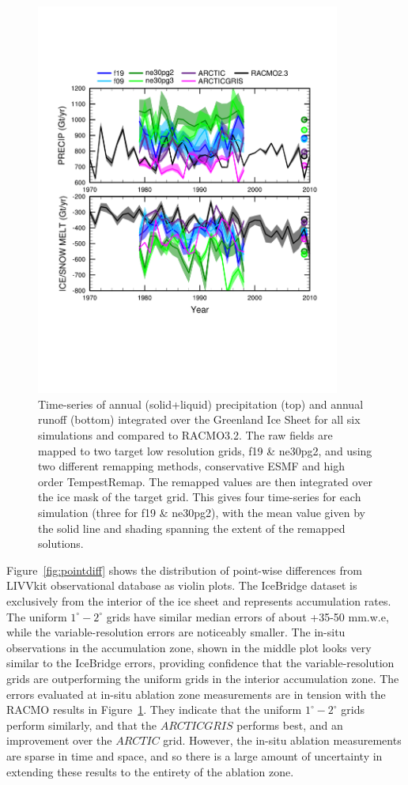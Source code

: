 \documentclass[draft]{agujournal2019}
\begin{document}
\begin{figure}[t]
\begin{center}
         \includegraphics[width=100mm]{figs/temp_tseries_GRIS.pdf}
\end{center}
\caption{Time-series of annual (solid+liquid) precipitation (top) and annual runoff (bottom) integrated over the Greenland Ice Sheet for all six simulations and compared to RACMO3.2. The raw fields are mapped to two target low resolution grids, f19 \& ne30pg2, and using two different remapping methods, conservative ESMF and high order TempestRemap. The remapped values are then integrated over the ice mask of the target grid. This gives four time-series for each simulation (three for f19 \& ne30pg2), with the mean value given by the solid line and shading spanning the extent of the remapped solutions.}
\label{fig:tseries}
\end{figure}

Figure~\ref{fig:pointdiff} shows the distribution of point-wise differences from LIVVkit observational database as violin plots. The IceBridge dataset is exclusively from the interior of the ice sheet and represents accumulation rates. The uniform $1^{\circ}-2^{\circ}$ grids have similar median errors of about +35-50 mm.w.e, while the variable-resolution errors are noticeably smaller. The in-situ observations in the accumulation zone, shown in the middle plot looks very similar to the IceBridge errors, providing confidence that the variable-resolution grids are outperforming the uniform grids in the interior accumulation zone. The errors evaluated at in-situ ablation zone measurements are in tension with the RACMO results in Figure~\ref{fig:tseries}. They indicate that the uniform $1^{\circ}-2^{\circ}$ grids perform similarly, and that the $ARCTICGRIS$ performs best, and an improvement over the $ARCTIC$ grid. However, the in-situ ablation measurements are sparse in time and space, and so there is a large amount of uncertainty in extending these results to the entirety of the ablation zone.
\end{document}
